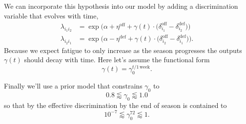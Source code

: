 \documentclass[
  letterpaper,
  DIV=11,
  numbers=noendperiod]{scrartcl}
\begin{document}
We can incorporate this hypothesis into our model by adding a
discrimination variable that evolves with time, \begin{align*}
\lambda_{i_{1} i_{2}}
&=
\exp \big(   \alpha + \eta^{\mathrm{off}}
           + \gamma(t) \cdot
               \big(  \delta_{i_{1}}^{\mathrm{off}}
                    - \delta_{i_{2}}^{\mathrm{def}} \big)
     \big)
\\
\lambda_{i_{2} i_{1}}
&=
\exp \big(   \alpha - \eta^{\mathrm{def}}
           + \gamma(t) \cdot
               \big(  \delta_{i_{2}}^{\mathrm{off}}
                    - \delta_{i_{1}}^{\mathrm{def}} \big)
     \big).
\end{align*} Because we expect fatigue to only increase as the season
progresses the outputs \(\gamma(t)\) should decay with time. Here let's
assume the functional form \[
\gamma(t) = \gamma_{0}^{t / 1 \, \mathrm{week} }.
\]

Finally we'll use a prior model that constrains \(\gamma_{0}\) to \[
0.8 \lessapprox \gamma_{0} \lessapprox 1.0
\] so that by the effective discrimination by the end of season is
contained to \[
10^{-7} \lessapprox \gamma_{0}^{72} \lessapprox 1.
\]
\end{document}
